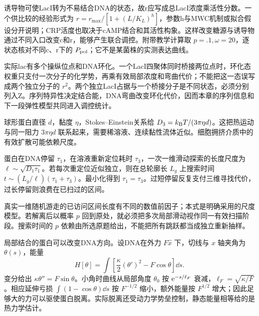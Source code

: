 诱导物可使LacI转为不易结合DNA的状态，故r应写成总LacI浓度乘活性分数。一个供比较的经验形式为 $r=r_{\max}/[1+(L/K_L)^h]$，参数h与MWC机制或拟合假设分开说明；CRP活度也取决于cAMP结合和其活性构象。这样改变糖源与诱导物通过不同入口改变c和r，能够产生联合调控。附带教学计算取 $p=.1,\omega=20$，逐状态核对不同c、r下的 $P_{\rm pol}$；它不是某菌株的实测表达曲线。

实际lac有多个操纵位点和DNA环化。一个LacI四聚体同时桥接两位点时，环化态权重只支付一次分子的化学势，再乘有效局部浓度和弯曲代价；不能把这一态误写成两个独立分子的 $r^2$。两个独立LacI占据与一个桥接分子是不同状态，必须分别列入Z。序列特异性决定结合能，DNA弯曲改变环化代价，因而本章的序列信息和下一段弹性模型共同进入调控统计。

球形蛋白直径 $d$，黏度 $\eta$，Stokes--Einstein关系给 $D_3=k_{\mathrm B} T/(3\pi\eta d)$。这把热运动与同一阻力 $3\pi\eta d$ 联系起来，需要稀溶液、连续黏性流体近似。细胞拥挤介质中的有效扩散可能依赖尺度。

蛋白在DNA停留 $\tau_1$，在溶液重新定位耗时 $\tau_3$，一次一维滑动探索的长度尺度为 $\ell\sim\sqrt{D_1\tau_1}$。若每次重定位近似独立，则在总轮廓长 $L_g$ 上搜索时间 $t\sim(L_g/\ell)(\tau_1+\tau_3)$。最小化得到 $\tau_1=\tau_3$。过短停留反复支付三维寻找代价，过长停留则浪费在已扫过的区间。

真实一维随机游走的已访问区间长度有不同的数值前因子；本式是明确采用的尺度模型。若解离后以概率 $p$ 回到原处，就必须把多次局部滑动视作同一有效扫描阶段。搜索时间的 $p$ 依赖由所选原题给出，不能把所有跳跃都当成独立重新抽样。

局部结合的蛋白可以改变DNA方向。设DNA在外力 $F\hat x$ 下，切线与 $x$ 轴夹角为 $\theta(s)$，能量
\[
H[\theta]=\int\left[\frac\kappa2(\theta')^2-F\cos\theta\right]\dd s.
\]
变分给出 $\kappa\theta''=F\sin\theta$。小角时曲线从局部角度 $\theta_0$ 按 $\mathrm e^{-s/\ell_F}$ 衰减，$\ell_F=\sqrt{\kappa/F}$。相应延伸亏损 $\int(1-\cos\theta)\dd s$ 按 $F^{-1/2}$ 缩小，额外能量按 $F^{1/2}$ 增大；因此足够大的力可以驱使蛋白脱离。实际脱离还受动力学势垒控制，静态能量相等给的是热力学估计。

\begin{center}
\end{center}

